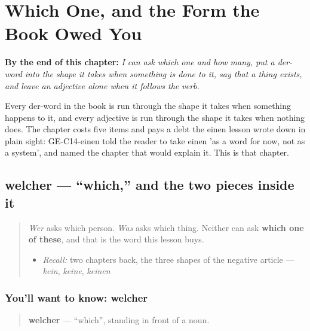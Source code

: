 
\chapter{Which One, and the Form the Book Owed You}
\label{ch:ge-akkusativ}

\begin{chapteropening}
\textbf{By the end of this chapter:} \emph{I can ask which one and how many, put a der-word into the shape it takes when something is done to it, say that a thing exists, and leave an adjective alone when it follows the verb.}

Every der-word in the book is run through the shape it takes when something happens to it, and every adjective is run through the shape it takes when nothing does. The chapter costs five items and pays a debt the einen lesson wrote down in plain sight: GE-C14-einen told the reader to take einen 'as a word for now, not as a system', and named the chapter that would explain it. This is that chapter.
\end{chapteropening}

\section[welcher]{welcher — \textquotedblleft{}which,\textquotedblright{} and the two pieces inside it}

\label{lesson:GE-C34-welcher}



\begin{quote}
\emph{Wer} asks which person. \emph{Was} asks which thing. Neither can ask \textbf{which one of these}, and that is the word this lesson buys.

\begin{itemize}
\raggedright
  \item \emph{Recall:} two chapters back, the three shapes of the negative article — \emph{kein}, \emph{keine}, \emph{keinen}
\end{itemize}
\end{quote}

\subsection*{You'll want to know: welcher}
\begin{quote}
\textbf{welcher} — \textquotedblleft{}which\textquotedblright{}, standing in front of a noun.
\end{quote}

